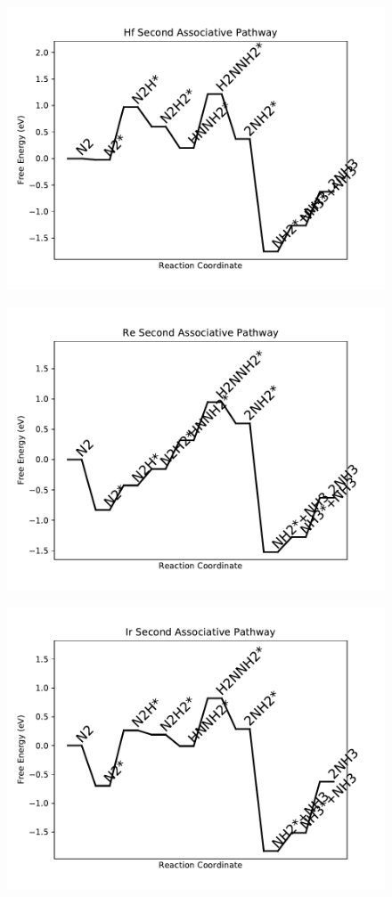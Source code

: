 \begin{figure}
\includegraphics[width=0.8\linewidth]{data/plots/Hf_associative_2.pdf}
\end{figure}

\begin{figure}
\includegraphics[width=0.8\linewidth]{data/plots/Re_associative_2.pdf}
\end{figure}

\begin{figure}
\includegraphics[width=0.8\linewidth]{data/plots/Ir_associative_2.pdf}
\end{figure}

